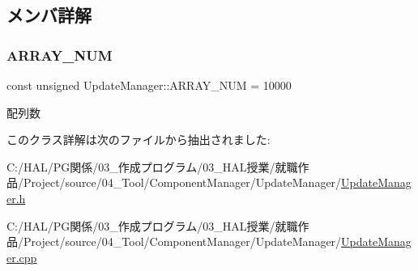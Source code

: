 \subsection{メンバ詳解}
\mbox{\label{class_update_manager_a280b884fb6a025cfd92d4f93086c60c6}} 
\subsubsection{\texorpdfstring{A\+R\+R\+A\+Y\+\_\+\+N\+UM}{ARRAY\_NUM}}
{\footnotesize\ttfamily const unsigned Update\+Manager\+::\+A\+R\+R\+A\+Y\+\_\+\+N\+UM = 10000\hspace{0.3cm}{\ttfamily [static]}}



配列数 



このクラス詳解は次のファイルから抽出されました\+:\begin{DoxyCompactItemize}
\item 
C\+:/\+H\+A\+L/\+P\+G関係/03\+\_\+作成プログラム/03\+\_\+\+H\+A\+L授業/就職作品/\+Project/source/04\+\_\+\+Tool/\+Component\+Manager/\+Update\+Manager/\mbox{\hyperlink{_update_manager_8h}{Update\+Manager.\+h}}\item 
C\+:/\+H\+A\+L/\+P\+G関係/03\+\_\+作成プログラム/03\+\_\+\+H\+A\+L授業/就職作品/\+Project/source/04\+\_\+\+Tool/\+Component\+Manager/\+Update\+Manager/\mbox{\hyperlink{_update_manager_8cpp}{Update\+Manager.\+cpp}}\end{DoxyCompactItemize}
